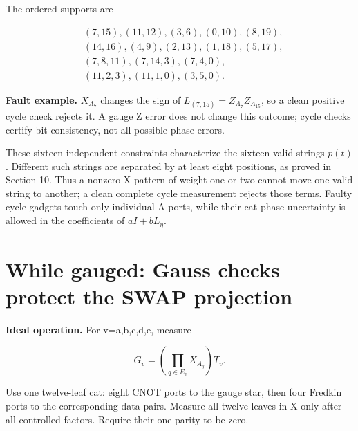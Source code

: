 \documentclass[11pt]{article}
\begin{document}
\begin{center}\begin{minipage}{\linewidth}

\end{minipage}\end{center}

The ordered supports are

\[
\begin{aligned}
&(7,15),(11,12),(3,6),(0,10),(8,19),\\
&(14,16),(4,9),(2,13),(1,18),(5,17),\\
&(7,8,11),(7,14,3),(7,4,0),\\
&(11,2,3),(11,1,0),(3,5,0).
\end{aligned}
\]

\textbf{Fault example.} \(X_{A_7}\) changes the sign of \(L_{(7,15)}=Z_{A_7}Z_{A_{15}}\), so a clean positive cycle check rejects it. A gauge Z error does not change this outcome; cycle checks certify bit consistency, not all possible phase errors.

These sixteen independent constraints characterize the sixteen valid strings \(p(t)\). Different such strings are separated by at least eight positions, as proved in Section 10. Thus a nonzero X pattern of weight one or two cannot move one valid string to another; a clean complete cycle measurement rejects those terms. Faulty cycle gadgets touch only individual A ports, while their cat-phase uncertainty is allowed in the coefficients of \(aI+bL_\eta\).

\section{While gauged: Gauss checks protect the SWAP projection}
\textbf{Ideal operation.} For v=a,b,c,d,e, measure

\[
G_v=\left(\prod_{q\in E_v}X_{A_q}\right)T_v.
\]

Use one twelve-leaf cat: eight CNOT ports to the gauge star, then four Fredkin ports to the corresponding data pairs. Measure all twelve leaves in X only after all controlled factors. Require their one parity to be zero.

\begin{center}\begin{minipage}{\linewidth}

\end{minipage}\end{center}
\end{document}
